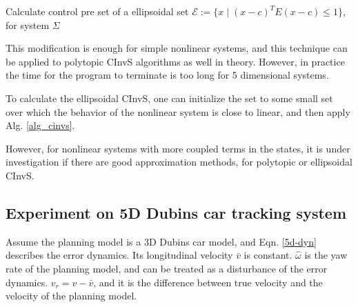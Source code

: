 \documentclass{article}
\begin{document}
\begin{algorithm}[H]
	\centering
	\caption{Calculate control pre set of a ellipsoidal set $\mathcal E := \{x\;|\;(x-c)^T E (x-c) \leq 1\}$, for system $\Sigma$}
	\begin{algorithmic}[1]
		\State{}
		\State{}
		\EndFunction
	\end{algorithmic}
	\label{alg_pre_nonlinear}
\end{algorithm}

This modification is enough for simple nonlinear systems, and this technique can be applied to polytopic CInvS algorithms as well in theory. However, in practice the time for the program to terminate is too long for 5 dimensional systems. 

To calculate the ellipsoidal CInvS, one can initialize the set to some small set over which the behavior of the nonlinear system is close to linear, and  then apply Alg. \ref{alg_cinvs}.

However, for nonlinear systems with more coupled terms in the states, it is under investigation if there are good approximation methods, for polytopic or ellipsoidal CInvS.

\subsection{Experiment on 5D Dubins car tracking system}

Assume the planning model is a 3D Dubins car model, and Eqn. \ref{5d-dyn} describes the error dynamics. Its longitudinal velocity $\bar{v}$ is constant. $\hat{\omega}$ is the yaw rate of the planning model, and can be treated as a disturbance of the error dynamics. $v_r = v - \bar{v}$, and it is the difference between true velocity and the velocity of the planning model. 
\end{document}
